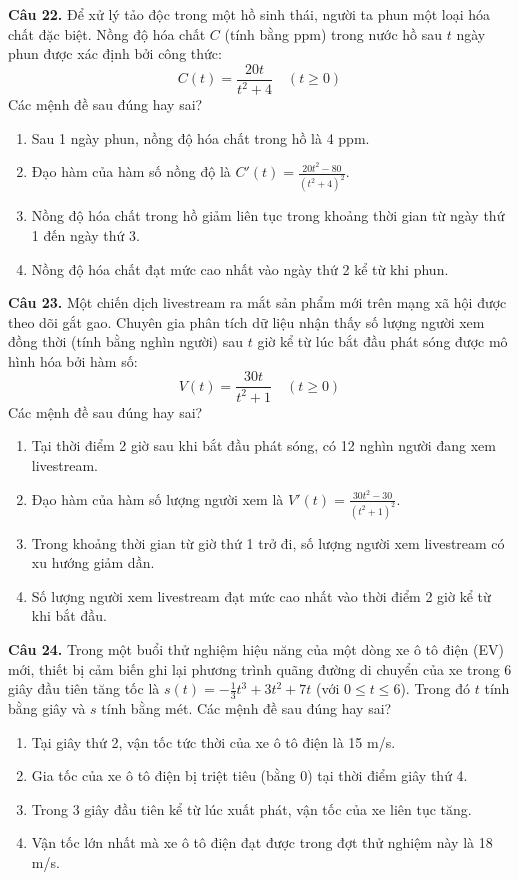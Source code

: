 \documentclass[12pt]{article}
\begin{document}
	\vspace{0.5cm}
	\noindent \textbf{Câu 22.} Để xử lý tảo độc trong một hồ sinh thái, người ta phun một loại hóa chất đặc biệt. Nồng độ hóa chất $C$ (tính bằng ppm) trong nước hồ sau $t$ ngày phun được xác định bởi công thức:
	\[ C(t) = \frac{20t}{t^2 + 4} \quad (t \ge 0) \]
	Các mệnh đề sau đúng hay sai?
	\begin{enumerate}[label=\textbf{\alph*)}]
		\item Sau 1 ngày phun, nồng độ hóa chất trong hồ là 4 ppm.   
		\item Đạo hàm của hàm số nồng độ là $C'(t) = \frac{20t^2 - 80}{(t^2 + 4)^2}$.   
		\item Nồng độ hóa chất trong hồ giảm liên tục trong khoảng thời gian từ ngày thứ 1 đến ngày thứ 3.   
		\item Nồng độ hóa chất đạt mức cao nhất vào ngày thứ 2 kể từ khi phun.   
	\end{enumerate}
	
	\vspace{0.5cm}
	\noindent \textbf{Câu 23.} Một chiến dịch livestream ra mắt sản phẩm mới trên mạng xã hội được theo dõi gắt gao. Chuyên gia phân tích dữ liệu nhận thấy số lượng người xem đồng thời (tính bằng nghìn người) sau $t$ giờ kể từ lúc bắt đầu phát sóng được mô hình hóa bởi hàm số:
	\[ V(t) = \frac{30t}{t^2 + 1} \quad (t \ge 0) \]
	Các mệnh đề sau đúng hay sai?
	\begin{enumerate}[label=\textbf{\alph*)}]
		\item Tại thời điểm 2 giờ sau khi bắt đầu phát sóng, có 12 nghìn người đang xem livestream.   
		\item Đạo hàm của hàm số lượng người xem là $V'(t) = \frac{30t^2 - 30}{(t^2 + 1)^2}$.   
		\item Trong khoảng thời gian từ giờ thứ 1 trở đi, số lượng người xem livestream có xu hướng giảm dần.   
		\item Số lượng người xem livestream đạt mức cao nhất vào thời điểm 2 giờ kể từ khi bắt đầu.   
	\end{enumerate}
	
	\vspace{0.5cm}
	\noindent \textbf{Câu 24.} Trong một buổi thử nghiệm hiệu năng của một dòng xe ô tô điện (EV) mới, thiết bị cảm biến ghi lại phương trình quãng đường di chuyển của xe trong 6 giây đầu tiên tăng tốc là $s(t) = -\frac{1}{3}t^3 + 3t^2 + 7t$ (với $0 \le t \le 6$). Trong đó $t$ tính bằng giây và $s$ tính bằng mét. Các mệnh đề sau đúng hay sai?
	\begin{enumerate}[label=\textbf{\alph*)}]
		\item Tại giây thứ 2, vận tốc tức thời của xe ô tô điện là 15 m/s.   
		\item Gia tốc của xe ô tô điện bị triệt tiêu (bằng 0) tại thời điểm giây thứ 4.   
		\item Trong 3 giây đầu tiên kể từ lúc xuất phát, vận tốc của xe liên tục tăng.   
		\item Vận tốc lớn nhất mà xe ô tô điện đạt được trong đợt thử nghiệm này là 18 m/s.   
	\end{enumerate}
	
\end{document}
